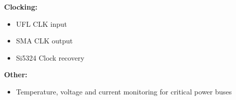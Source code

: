 \textbf{Clocking:}

\begin{itemize}
	\item UFL CLK input
	\item SMA CLK output
	\item Si5324 Clock recovery
	
\end{itemize}


\textbf{Other:}

\begin{itemize}
	\item Temperature, voltage and current monitoring for critical power buses

	
\end{itemize}








